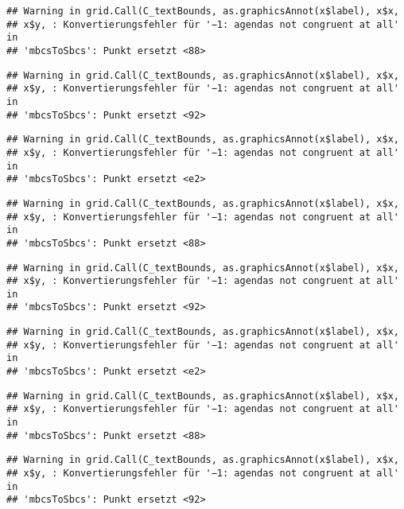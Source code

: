 \documentclass[]{article}
\begin{document}
\begin{verbatim}
## Warning in grid.Call(C_textBounds, as.graphicsAnnot(x$label), x$x,
## x$y, : Konvertierungsfehler für '−1: agendas not congruent at all' in
## 'mbcsToSbcs': Punkt ersetzt <88>
\end{verbatim}

\begin{verbatim}
## Warning in grid.Call(C_textBounds, as.graphicsAnnot(x$label), x$x,
## x$y, : Konvertierungsfehler für '−1: agendas not congruent at all' in
## 'mbcsToSbcs': Punkt ersetzt <92>
\end{verbatim}

\begin{verbatim}
## Warning in grid.Call(C_textBounds, as.graphicsAnnot(x$label), x$x,
## x$y, : Konvertierungsfehler für '−1: agendas not congruent at all' in
## 'mbcsToSbcs': Punkt ersetzt <e2>
\end{verbatim}

\begin{verbatim}
## Warning in grid.Call(C_textBounds, as.graphicsAnnot(x$label), x$x,
## x$y, : Konvertierungsfehler für '−1: agendas not congruent at all' in
## 'mbcsToSbcs': Punkt ersetzt <88>
\end{verbatim}

\begin{verbatim}
## Warning in grid.Call(C_textBounds, as.graphicsAnnot(x$label), x$x,
## x$y, : Konvertierungsfehler für '−1: agendas not congruent at all' in
## 'mbcsToSbcs': Punkt ersetzt <92>
\end{verbatim}

\begin{verbatim}
## Warning in grid.Call(C_textBounds, as.graphicsAnnot(x$label), x$x,
## x$y, : Konvertierungsfehler für '−1: agendas not congruent at all' in
## 'mbcsToSbcs': Punkt ersetzt <e2>
\end{verbatim}

\begin{verbatim}
## Warning in grid.Call(C_textBounds, as.graphicsAnnot(x$label), x$x,
## x$y, : Konvertierungsfehler für '−1: agendas not congruent at all' in
## 'mbcsToSbcs': Punkt ersetzt <88>
\end{verbatim}

\begin{verbatim}
## Warning in grid.Call(C_textBounds, as.graphicsAnnot(x$label), x$x,
## x$y, : Konvertierungsfehler für '−1: agendas not congruent at all' in
## 'mbcsToSbcs': Punkt ersetzt <92>
\end{verbatim}
\end{document}
